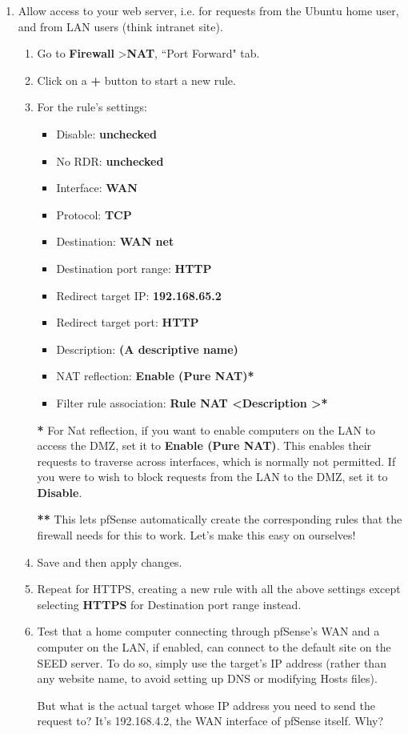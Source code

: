 \documentclass[12pt]{extarticle}
\begin{document}
\begin{enumerate}
\item Allow access to your web server, i.e. for requests from the Ubuntu home user, and from LAN users (think intranet site).
\begin{enumerate}
    \item Go to \textbf{Firewall} \textgreater \textbf{NAT}, ``Port Forward" tab.
    \item Click on a \textbf{+} button to start a new rule.
    \item For the rule's settings:
    \begin{itemize}
        \item Disable: \textbf{unchecked}
        \item No RDR: \textbf{unchecked}
        \item Interface: \textbf{WAN}
        \item Protocol: \textbf{TCP}
        \item Destination: \textbf{WAN net}
        \item Destination port range: \textbf{HTTP}
        \item Redirect target IP: \textbf{192.168.65.2}
        \item Redirect target port: \textbf{HTTP}
        \item Description: \textbf{(A descriptive name)}
        \item NAT reflection: \textbf{Enable (Pure NAT)*}
        \item Filter rule association: \textbf{Rule NAT \textless Description \textgreater**}
    \end{itemize}
    
    \textbf{*} For Nat reflection, if you want to enable computers on the LAN to access the DMZ, set it to \textbf{Enable (Pure NAT)}. This enables their requests to traverse across interfaces, which is normally not permitted. If you were to wish to block requests from the LAN to the DMZ, set it to \textbf{Disable}.
    
    \textbf{**} This lets pfSense automatically create the corresponding rules that the firewall needs for this to work. Let's make this easy on ourselves!
    
    \item Save and then apply changes.
    
    \item Repeat for HTTPS, creating a new rule with all the above settings except selecting \textbf{HTTPS} for Destination port range instead.
    
    \item Test that a home computer connecting through pfSense's WAN and a computer on the LAN, if enabled, can connect to the default site on the SEED server. To do so, simply use the target's IP address (rather than any website name, to avoid setting up DNS or modifying Hosts files).
    
    But what is the actual target whose IP address you need to send the request to? It's 192.168.4.2, the WAN interface of pfSense itself. Why?
\end{enumerate}

\end{enumerate}
\end{document}
